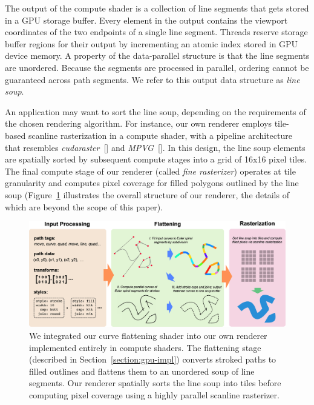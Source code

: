 \documentclass[sigconf, nonacm]{acmart}
\begin{document}
The output of the compute shader is a collection of line segments that gets stored in a GPU storage buffer. Every element in the output contains the viewport coordinates of the two endpoints of a single line segment. Threads reserve storage buffer regions for their output by incrementing an atomic index stored in GPU device memory. A property of the data-parallel structure is that the line segments are unordered. Because the segments are processed in parallel, ordering cannot be guaranteed across path segments. We refer to this output data structure as \emph{line soup}.

An application may want to sort the line soup, depending on the requirements of the chosen rendering algorithm. For instance, our own renderer employs tile-based scanline rasterization in a compute shader, with a pipeline architecture that resembles \emph{cudaraster}~[] and \emph{MPVG}~[]. In this design, the line soup elements are spatially sorted by subsequent compute stages into a grid of 16x16 pixel tiles. The final compute stage of our renderer (called \emph{fine rasterizer}) operates at tile granularity and computes pixel coverage for filled polygons outlined by the line soup (Figure~\ref{fig:pipeline} illustrates the overall structure of our renderer, the details of which are beyond the scope of this paper).

\begin{figure}
    \includegraphics[scale=0.275]{pipeline}
    \caption{We integrated our curve flattening shader into our own renderer implemented entirely in compute shaders. The flattening stage (described in Section~\ref{section:gpu-impl}) converts stroked paths to filled outlines and flattens them to an unordered soup of line segments. Our renderer spatially sorts the line soup into tiles before computing pixel coverage using a highly parallel scanline rasterizer.}
    \label{fig:pipeline}
\end{figure}
\end{document}
